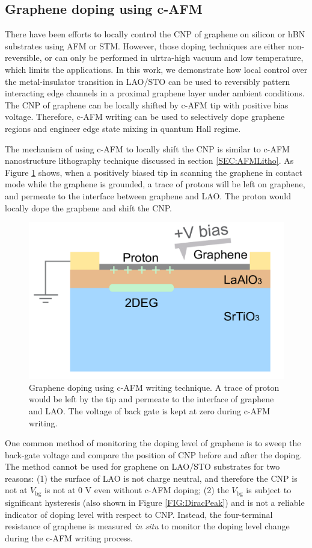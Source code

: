 \documentclass[pdflatex, sectionletters, 12pt]{pittetd}    %
\begin{document}
\subsection{Graphene doping using c-AFM}

There have been efforts to locally control the CNP of graphene on silicon or hBN substrates using AFM\cite{schmidt2013mixing} or STM\cite{velasco2016nanoscale}. However, those doping techniques are either non-reversible, or can only be performed in ulrtra-high vacuum and low temperature, which limits the applications. In this work, we demonstrate how local control over the metal-insulator transition in LAO/STO can be used to reversibly pattern interacting edge channels in a proximal graphene layer under ambient conditions. The CNP of graphene can be locally shifted by c-AFM tip with positive bias voltage. Therefore, c-AFM writing can be used to selectively dope graphene regions and engineer edge state mixing in quantum Hall regime.

The mechanism of using c-AFM to locally shift the CNP is similar to c-AFM nanostructure lithography technique discussed in section \ref{SEC:AFMLitho}. As Figure \ref{FIG:GrapheneAFM} shows, when a positively biased tip in scanning the graphene in contact mode while the graphene is grounded, a trace of protons will be left on graphene, and permeate\cite{hu2014proton} to the interface between graphene and LAO. The proton would locally dope the graphene and shift the CNP. 
\\

\begin{figure}[h!]
	\centering
	\includegraphics[width=.45\textwidth]{Drawing/GrapheneAFM.pdf}
	\caption{Graphene doping using c-AFM writing technique. A trace of proton would be left by the tip and permeate to the interface of graphene and LAO. The voltage of back gate is kept at zero during c-AFM writing.}
	\label{FIG:GrapheneAFM}
\end{figure}

One common method of monitoring the doping level of graphene is to sweep the back-gate voltage and compare the position of CNP before and after the doping. The method cannot be used for graphene on LAO/STO substrates for two reasons: (1) the surface of LAO is not charge neutral, and therefore the CNP is not at $V_\mathrm{bg}$ is not at 0 V even without c-AFM doping; (2) the $V_\mathrm{bg}$ is subject to significant hysteresis\cite{couto2011transport, jnawali2017room} (also shown in Figure \ref{FIG:DiracPeak}) and is not a reliable indicator of doping level with respect to CNP. Instead, the four-terminal resistance of graphene is measured \emph{in situ} to monitor the doping level change during the c-AFM writing process. 
\end{document}
